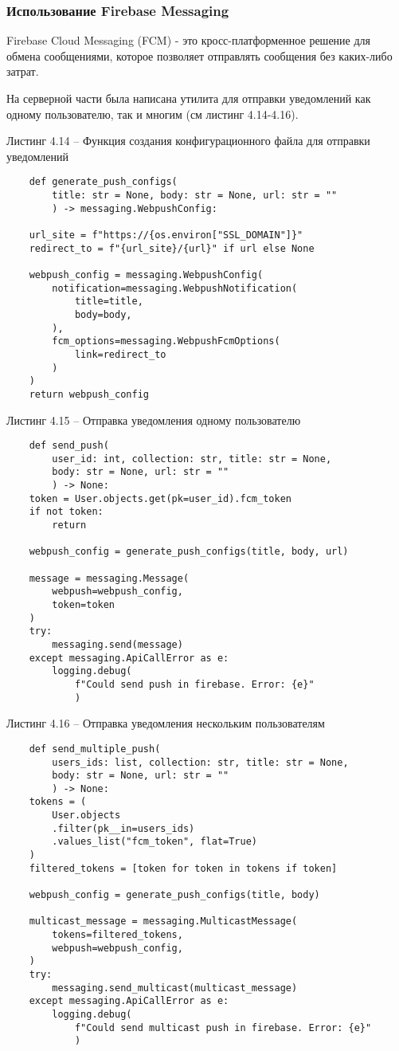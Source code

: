 \subsubsection{Использование Firebase Messaging}\hfill

Firebase Cloud Messaging (FCM) - это кросс-платформенное решение для обмена сообщениями, которое позволяет  отправлять сообщения без каких-либо затрат.

На серверной части была написана утилита для отправки уведомлений как одному пользователю, так и многим (см листинг 4.14-4.16).


Листинг 4.14 – Функция создания конфигурационного файла для отправки уведомлений
\begin{lstlisting}
    def generate_push_configs(
        title: str = None, body: str = None, url: str = ""
        ) -> messaging.WebpushConfig:

    url_site = f"https://{os.environ["SSL_DOMAIN"]}"
    redirect_to = f"{url_site}/{url}" if url else None

    webpush_config = messaging.WebpushConfig(
        notification=messaging.WebpushNotification(
            title=title,
            body=body,
        ),
        fcm_options=messaging.WebpushFcmOptions(
            link=redirect_to
        )
    )
    return webpush_config
\end{lstlisting}

Листинг 4.15 – Отправка уведомления одному пользователю
\begin{lstlisting}
    def send_push(
        user_id: int, collection: str, title: str = None,
        body: str = None, url: str = ""
        ) -> None:
    token = User.objects.get(pk=user_id).fcm_token
    if not token:
        return

    webpush_config = generate_push_configs(title, body, url)

    message = messaging.Message(
        webpush=webpush_config,
        token=token
    )
    try:
        messaging.send(message)
    except messaging.ApiCallError as e:
        logging.debug(
            f"Could send push in firebase. Error: {e}"
            )
\end{lstlisting}

Листинг 4.16 – Отправка уведомления нескольким пользователям
\begin{lstlisting}
    def send_multiple_push(
        users_ids: list, collection: str, title: str = None,
        body: str = None, url: str = ""
        ) -> None:
    tokens = (
        User.objects
        .filter(pk__in=users_ids)
        .values_list("fcm_token", flat=True)
    )
    filtered_tokens = [token for token in tokens if token]

    webpush_config = generate_push_configs(title, body)

    multicast_message = messaging.MulticastMessage(
        tokens=filtered_tokens,
        webpush=webpush_config,
    )
    try:
        messaging.send_multicast(multicast_message)
    except messaging.ApiCallError as e:
        logging.debug(
            f"Could send multicast push in firebase. Error: {e}"
            )
\end{lstlisting}

